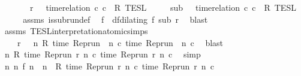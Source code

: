 \begin{isabellebody}
\ \ \ \ \ \ \ {\isacartoucheopen}r\ {\isasymin}\ {\isasymlbrakk}\ time{\isacharminus}relation\ {\isasymlfloor}c\ c\ {\isasymin}\ R\ {\isasymrbrakk}\isactrlsub T\isactrlsub E\isactrlsub S\isactrlsub L{\isacartoucheclose}\isanewline
\ \ \ \ \ {\isacartoucheopen}sub\ {\isasymin}\ {\isasymlbrakk}\ time{\isacharminus}relation\ {\isasymlfloor}c\ c\ {\isasymin}\ R\ {\isasymrbrakk}\isactrlsub T\isactrlsub E\isactrlsub S\isactrlsub L{\isacartoucheclose}\isanewline
%
\isadelimproof
%
\endisadelimproof
%
\isatagproof
{}\isamarkupfalse%
\ {\isacharminus}\isanewline
\ \ \isamarkupfalse%
\ assms{\isacharparenleft}{}{\isacharparenright}\ is{\isacharunderscore}subrun{\isacharunderscore}def\ \isamarkupfalse%
\ f\ \ df{\isacharcolon}{\isacartoucheopen}dilating\ f\ sub\ r{\isacartoucheclose}\ \isamarkupfalse%
\ blast\isanewline
\ \ \isamarkupfalse%
\ \isamarkupfalse%
\ assms{\isacharparenleft}{}{\isacharparenright}\ TESL{\isacharunderscore}interpretation{\isacharunderscore}atomic{\isachardot}simps{\isacharparenleft}{}{\isacharparenright}\ \isamarkupfalse%
\isanewline
\ \ \ \ {\isacartoucheopen}r\ {\isasymin}\ {\isacharbraceleft}{\isasymrho}{\isachardot}\ {\isasymforall}n{\isachardot}\ R\ {\isacharparenleft}time\ {\isacharparenleft}{\isacharparenleft}Rep{\isacharunderscore}run\ {\isasymrho}{\isacharparenright}\ n\ c\ time\ {\isacharparenleft}{\isacharparenleft}Rep{\isacharunderscore}run\ {\isasymrho}{\isacharparenright}\ n\ c\ \isamarkupfalse%
\ blast\isanewline
\ \ \isamarkupfalse%
\ {\isacartoucheopen}{\isasymforall}n{\isachardot}\ R\ {\isacharparenleft}time\ {\isacharparenleft}{\isacharparenleft}Rep{\isacharunderscore}run\ r{\isacharparenright}\ n\ c\ time\ {\isacharparenleft}{\isacharparenleft}Rep{\isacharunderscore}run\ r{\isacharparenright}\ n\ c\ \isamarkupfalse%
\ simp\isanewline
\ \ \isamarkupfalse%
\ {\isacartoucheopen}{\isasymforall}n{\isachardot}\ {\isacharparenleft}{\isasymexists}n\ f\ n\ {\isacharequal}\ n{\isacharparenright}\ {\isasymlongrightarrow}\ R\ {\isacharparenleft}time\ {\isacharparenleft}{\isacharparenleft}Rep{\isacharunderscore}run\ r{\isacharparenright}\ n\ c\ time\ {\isacharparenleft}{\isacharparenleft}Rep{\isacharunderscore}run\ r{\isacharparenright}\ n\ c\ \isamarkupfalse%

\end{isabellebody}
